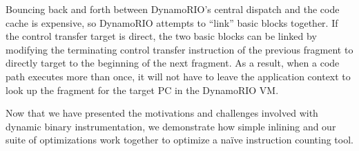 Bouncing back and forth between DynamoRIO's central dispatch and the code cache
is expensive, so DynamoRIO attempts to ``link'' basic blocks together.  If the
control transfer target is direct, the two basic blocks can be linked by
modifying the terminating control transfer instruction of the previous fragment
to directly target to the beginning of the next fragment.  As a result, when a
code path executes more than once, it will not have to leave the application
context to look up the fragment for the target PC in the DynamoRIO VM.

Now that we have presented the motivations and challenges involved with dynamic
binary instrumentation, we demonstrate how simple inlining and our suite of
optimizations work together to optimize a na\"ive instruction counting tool.
